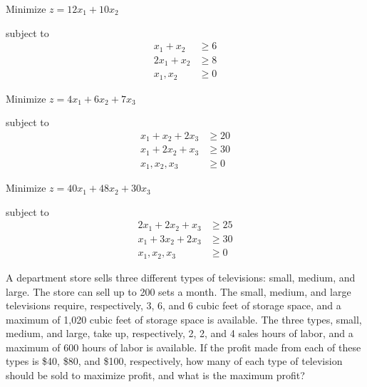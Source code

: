 \begin{puzzle}
    Minimize \( z = 12x_1 + 10x_2 \)

    subject to
    \begin{align*}
        x_1 + x_2  & \geq 6 \\
        2x_1 + x_2 & \geq 8 \\
        x_1, x_2   & \geq 0
    \end{align*}
\end{puzzle}

\begin{puzzle}
    Minimize \( z = 4x_1 + 6x_2 + 7x_3 \)

    subject to
    \begin{align*}
        x_1 + x_2 + 2x_3 & \geq 20 \\
        x_1 + 2x_2 + x_3 & \geq 30 \\
        x_1, x_2, x_3    & \geq 0
    \end{align*}
\end{puzzle}

\begin{puzzle}
    Minimize \( z = 40x_1 + 48x_2 + 30x_3 \)

    subject to
    \begin{align*}
        2x_1 + 2x_2 + x_3 & \geq 25 \\
        x_1 + 3x_2 + 2x_3 & \geq 30 \\
        x_1, x_2, x_3     & \geq 0
    \end{align*}
\end{puzzle}

\begin{puzzle}
    A department store sells three different types of televisions: small, medium, and large. The store
    can sell up to 200 sets a month. The small, medium, and large televisions require, respectively, 3, 6,
    and 6 cubic feet of storage space, and a maximum of 1,020 cubic feet of storage space is available.
    The three types, small, medium, and large, take up, respectively, 2, 2, and 4 sales hours of labor,
    and a maximum of 600 hours of labor is available. If the profit made from each of these types is
    \$40, \$80, and \$100, respectively, how many of each type of television should be sold to maximize
    profit, and what is the maximum profit?
\end{puzzle}

